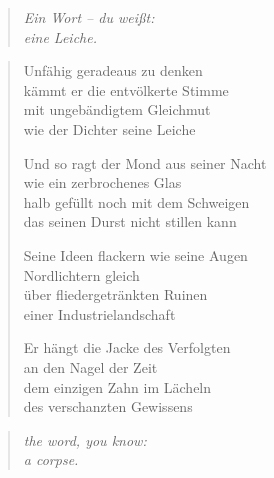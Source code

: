 
\cleartoverso


\begin{quote}
\itshape\smaller
Ein Wort -- du weißt:\\
eine Leiche.

\end{quote}

\begin{verse}

Unfähig geradeaus zu denken\\
kämmt er die entvölkerte Stimme\\
mit ungebändigtem Gleichmut\\
wie der Dichter seine Leiche

Und so ragt der Mond aus seiner Nacht\\
wie ein zerbrochenes Glas\\
halb gefüllt noch mit dem Schweigen\\
das seinen Durst nicht stillen kann

Seine Ideen flackern wie seine Augen\\
Nordlichtern gleich\\
über fliedergetränkten Ruinen\\
einer Industrielandschaft

Er hängt die Jacke des Verfolgten\\
an den Nagel der Zeit\\
dem einzigen Zahn im Lächeln\\
des verschanzten Gewissens
\end{verse}

\clearpage


\begin{quote}
\itshape\smaller
the word, you know:\\
a corpse.

\end{quote}


